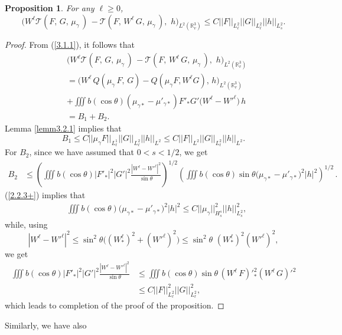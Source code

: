 \documentclass{amsart}[12pt, article]
\newtheorem{prop}[theo]{Proposition}
\begin{document}
\begin{prop}\label{prop3.2.1}
For any $\ell\geq 0$,
\begin{equation}\label{3.2.2}
\Big(W^\ell {{\mathcal T}}(F,\, G,\, \mu_\gamma\,)\, -{{\mathcal T}}(F,\, W^\ell\,G,\,
\mu_\gamma\,),\,\, h\Big)_{L^2({{{\mathbb R}}}^3_{v})}\leq C||F||_{L^2_\ell} ||
G ||_{L^2_\ell} || h ||_{L^2_s}.
\end{equation}
\end{prop}
\begin{proof} {}From (\ref{3.1.1}), it follows that
\begin{align*}
&\Big(W^\ell {{\mathcal T}}(F,\, G,\, \mu_\gamma\,)\, -{{\mathcal T}}(F,\, W^\ell\,G,\,
\mu_\gamma\,),\,\, h\Big)_{L^2({{{\mathbb R}}}^3_{v})}\\
 &= \Big(W^\ell\,
Q(\mu_\gamma\, F, \,G)-Q(\mu_\gamma F , W^\ell G ),\,
h\Big)_{L^2({{{\mathbb R}}}^3_{v})}\\
& + \iiint b(\cos\theta) (\mu_{\gamma\ast} - \mu '_{\gamma\ast} )
F'_\ast G' \big(W^\ell -W'^\ell\big)\,h\\
&= B_1 + B_2.
\end{align*}
Lemma \ref{lemm3.2.1} implies that
$$
B_1 \leq C||\mu_\gamma F||_{L^1_\ell} || G ||_{L^2_\ell} || h
||_{L^2}\leq C||F||_{L^2} || G ||_{L^2_\ell} || h ||_{L^2}.
$$
For $B_2$, since we have assumed that $0<s< 1/2$, we get
\begin{align*}
B_2 &\leq \left(\iiint b(\cos\theta) | F'_\ast |^2 | G'|^2
\frac{{| W^\ell - {W'}^\ell |^2}}{\sin \theta} \right)^{1/2}
\left(\iiint b(\cos\theta) \sin \theta \Big( \mu_{\gamma\ast} -
\mu'_{\gamma\ast} \Big)^2 |h|^2 \right)^{1/2}\, .
\end{align*}
(\ref{2.2.3+}) implies that
\begin{align*}
& \iiint b(\cos\theta) \Big( \mu_{\gamma\ast} - \mu'_{\gamma\ast}
\Big)^2 |h|^2 \leq C || \mu_\gamma ||^2_{H^s_s} ||h||^2_{L^2_s},
\end{align*}
while, using
$$
| W^\ell - W'^\ell |^2 \leq \sin^2\theta\Big( (W^\ell_\ast)^2 +
(W'^{\ell} )^2 \Big) \leq \sin^2\theta \,\,(W^\ell_\ast)^2
(W'^{\ell} )^2,
$$
we get
\begin{align*}
\iiint b(\cos\theta) | F'_\ast |^2 | G'|^2 \frac{{| W^\ell -
{W'}^\ell |^2}}{\sin \theta} &\leq \iiint b(\cos\theta) \sin\theta\,
(W^\ell\, F )'^{2}_\ast (W^\ell\, G )'^{2}\\
&\leq C || F||^2_{L^2_\ell} || G ||^2_{L^2_\ell},
\end{align*}
which leads to  completion of  the proof of the
proposition.
\end{proof}
Similarly, we have also
\end{document}
